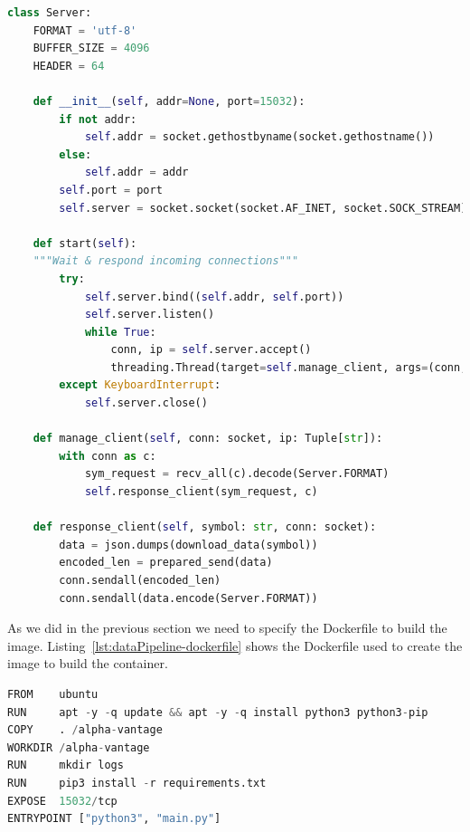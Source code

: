 \begin{lstlisting}[language=python,caption=server.py,label={lst:server.py}]
class Server:
    FORMAT = 'utf-8'
    BUFFER_SIZE = 4096
    HEADER = 64

    def __init__(self, addr=None, port=15032):
        if not addr:
            self.addr = socket.gethostbyname(socket.gethostname())
        else:
            self.addr = addr
        self.port = port
        self.server = socket.socket(socket.AF_INET, socket.SOCK_STREAM)

    def start(self):
    """Wait & respond incoming connections"""
        try:
            self.server.bind((self.addr, self.port))
            self.server.listen()
            while True:
                conn, ip = self.server.accept()
                threading.Thread(target=self.manage_client, args=(conn, ip)).start()
        except KeyboardInterrupt:
            self.server.close()

    def manage_client(self, conn: socket, ip: Tuple[str]):
        with conn as c:
            sym_request = recv_all(c).decode(Server.FORMAT)
            self.response_client(sym_request, c)

    def response_client(self, symbol: str, conn: socket):
        data = json.dumps(download_data(symbol))
        encoded_len = prepared_send(data)
        conn.sendall(encoded_len)
        conn.sendall(data.encode(Server.FORMAT))
\end{lstlisting}

As we did in the previous section we need to specify the Dockerfile to build the image. Listing~\ref{lst:dataPipeline-dockerfile} shows the Dockerfile used to create the image to build the container.

\begin{lstlisting}[language=python,caption=Data Pipeline Dockerfile,label={lst:dataPipeline-dockerfile}]
FROM    ubuntu
RUN     apt -y -q update && apt -y -q install python3 python3-pip
COPY    . /alpha-vantage
WORKDIR /alpha-vantage
RUN     mkdir logs
RUN     pip3 install -r requirements.txt
EXPOSE  15032/tcp
ENTRYPOINT ["python3", "main.py"]
\end{lstlisting}

    

